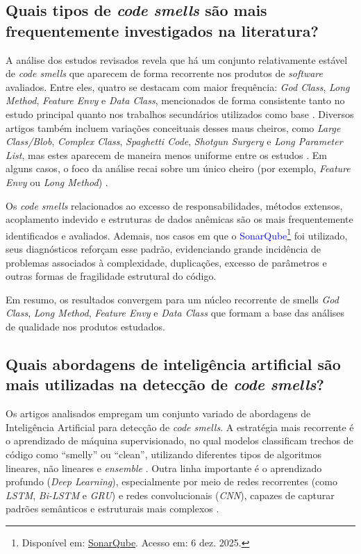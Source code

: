 {\subsection{Quais tipos de \textit{code smells} são mais frequentemente investigados na literatura?}

A análise dos estudos revisados revela que há um conjunto relativamente 
estável de \textit{code smells} que aparecem de forma recorrente nos produtos de \textit{software} 
avaliados. Entre eles, quatro se destacam com maior frequência: \textit{God Class}, 
\textit{Long Method}, \textit{Feature Envy} e \textit{Data Class}, mencionados de forma 
consistente tanto no estudo principal quanto nos trabalhos secundários utilizados como base \cite{Ho2025EnseSmells,Madeyski2023Industry,Sahu2024Predicting}. 
Diversos artigos também incluem variações conceituais desses maus cheiros, como 
\textit{Large Class/Blob}, \textit{Complex Class}, \textit{Spaghetti Code}, 
\textit{Shotgun Surgery} e \textit{Long Parameter List}, mas estes aparecem de maneira 
menos uniforme entre os estudos \cite{Huang2024AligningXAI}. Em alguns casos, o foco da análise recai sobre um único 
cheiro (por exemplo, \textit{Feature Envy} ou \textit{Long Method}) \cite{AlFraihat2024FeatureEnvy}.


Os \textit{code smells} relacionados ao excesso de responsabilidades, métodos extensos, 
acoplamento indevido e estruturas de dados anêmicas são os mais frequentemente 
identificados e avaliados. Ademais, nos casos em que o \textcolor{blue}{SonarQube}\footnote{Disponível em: \href{https://www.sonarqube.org/}{SonarQube}. Acesso em: 6 dez. 2025.}
foi utilizado, seus diagnósticos reforçam esse padrão, evidenciando grande incidência de problemas associados 
à complexidade, duplicações, excesso de parâmetros e outras formas de fragilidade 
estrutural do código. 

Em resumo, os resultados convergem para um núcleo recorrente de smells 
\textit{God Class}, \textit{Long Method}, \textit{Feature Envy} e \textit{Data Class} 
que formam a base das análises de qualidade nos produtos estudados.


\subsection{Quais abordagens de inteligência artificial são mais utilizadas na detecção de \textit{code smells}?}

Os artigos analisados empregam um conjunto variado de abordagens de Inteligência 
Artificial para detecção de \textit{code smells}. A estratégia mais recorrente é o 
aprendizado de máquina supervisionado, no qual modelos classificam trechos de código 
como ``smelly'' ou ``clean'', utilizando diferentes tipos de algoritmos lineares, não 
lineares e \textit{ensemble} \cite{Jain2024MetaHeuristic}. Outra linha importante é o aprendizado profundo 
(\textit{Deep Learning}), especialmente por meio de redes recorrentes (como \textit{LSTM}, 
\textit{Bi-LSTM} e \textit{GRU}) e redes convolucionais (\textit{CNN}), capazes de capturar 
padrões semânticos e estruturais mais complexos \cite{Yahya2023DeepLearningSmells,Ho2023FusionCNNLSTM}.

}
